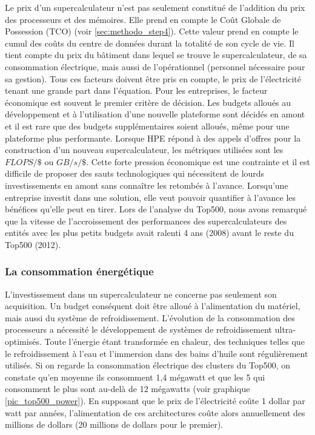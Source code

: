         Le prix d'un supercalculateur n'est pas seulement constitué de l'addition du prix des processeurs et des mémoires. Elle prend en compte le Coût Globale de Possession (TCO) (voir \autoref{sec:methodo_step4}). Cette valeur prend en compte le cumul des coûts du centre de données durant la totalité de son cycle de vie. Il tient compte du prix du bâtiment dans lequel se trouve le supercalculateur, de sa consommation électrique, mais aussi de l'opérationnel (personnel nécessaire pour sa gestion). Tous ces facteurs doivent être pris en compte, le prix de l'électricité tenant une grande part dans l'équation. 
        Pour les entreprises, le facteur économique est souvent le premier critère de décision. Les budgets alloués au développement et à l'utilisation d'une nouvelle plateforme sont décidés en amont et il est rare que des budgets supplémentaires soient alloués, même pour une plateforme plus performante. Lorsque HPE répond à des appels d'offres pour la construction d'un nouveau supercalculateur, les métriques utilisées sont les $FLOPS/\$$ ou $GB/s/\$$. Cette forte pression économique est une contrainte et il est difficile de proposer des sauts technologiques qui nécessitent de lourds investissements en amont sans connaître les retombés à l'avance. Lorsqu'une entreprise investit dans une solution, elle veut pouvoir quantifier à l'avance les bénéfices qu'elle peut en tirer. Lors de l'analyse du Top500, nous avons remarqué que la vitesse de l'accroissement des performances des supercalculateurs des entités avec les plus petits budgets avait ralenti 4 ans (2008) avant le reste du Top500 (2012). 
    
        
    \subsubsection{La consommation énergétique}\label{sec:edl_chal_energie}
  
        L'investissement dans un supercalculateur ne concerne pas seulement son acquisition. Un budget conséquent doit être alloué à l'alimentation du matériel, mais aussi du système de refroidissement. L’évolution de la consommation des processeurs a nécessité le développement de systèmes de refroidissement ultra-optimisés. Toute l’énergie étant transformée en chaleur, des techniques telles que le refroidissement à l’eau et l’immersion dans des bains d’huile sont régulièrement utilisés. Si on regarde la consommation électrique des clusters du Top500, on constate qu'en moyenne ils consomment 1,4 mégawatt et que les 5 qui consomment le plus sont au-delà de 12 mégawatts (voir graphique \ref{pic_top500_power}). En supposant que le prix de l'électricité coûte 1 dollar par watt par années, l'alimentation de ces architectures coûte alors annuellement des millions de dollars (20 millions de dollars pour le premier).
        
